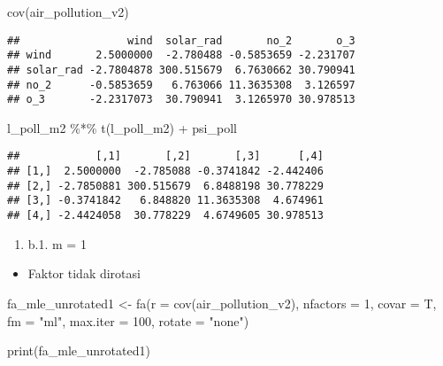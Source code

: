\documentclass[
]{article}
\newenvironment{Shaded}{\begin{snugshade}}{\end{snugshade}}
\newcommand{\AttributeTok}[1]{\textcolor[rgb]{0.77,0.63,0.00}{#1}}
\newcommand{\DecValTok}[1]{\textcolor[rgb]{0.00,0.00,0.81}{#1}}
\newcommand{\FunctionTok}[1]{\textcolor[rgb]{0.00,0.00,0.00}{#1}}
\newcommand{\NormalTok}[1]{#1}
\newcommand{\OtherTok}[1]{\textcolor[rgb]{0.56,0.35,0.01}{#1}}
\newcommand{\SpecialCharTok}[1]{\textcolor[rgb]{0.00,0.00,0.00}{#1}}
\newcommand{\StringTok}[1]{\textcolor[rgb]{0.31,0.60,0.02}{#1}}
\providecommand{\tightlist}{%
  \setlength{\itemsep}{0pt}\setlength{\parskip}{0pt}}
\begin{document}
\begin{Shaded}
\begin{Highlighting}[]
\FunctionTok{cov}\NormalTok{(air\_pollution\_v2)}
\end{Highlighting}
\end{Shaded}

\begin{verbatim}
##                 wind  solar_rad       no_2       o_3
## wind       2.5000000  -2.780488 -0.5853659 -2.231707
## solar_rad -2.7804878 300.515679  6.7630662 30.790941
## no_2      -0.5853659   6.763066 11.3635308  3.126597
## o_3       -2.2317073  30.790941  3.1265970 30.978513
\end{verbatim}

\begin{Shaded}
\begin{Highlighting}[]
\NormalTok{l\_poll\_m2 }\SpecialCharTok{\%*\%} \FunctionTok{t}\NormalTok{(l\_poll\_m2) }\SpecialCharTok{+}\NormalTok{ psi\_poll}
\end{Highlighting}
\end{Shaded}

\begin{verbatim}
##            [,1]       [,2]       [,3]      [,4]
## [1,]  2.5000000  -2.785088 -0.3741842 -2.442406
## [2,] -2.7850881 300.515679  6.8488198 30.778229
## [3,] -0.3741842   6.848820 11.3635308  4.674961
## [4,] -2.4424058  30.778229  4.6749605 30.978513
\end{verbatim}

\begin{enumerate}
\def\labelenumi{\alph{enumi}.}
\setcounter{enumi}{1}
\tightlist
\item
  b.1. m = 1
\end{enumerate}

\begin{itemize}
\tightlist
\item
  Faktor tidak dirotasi
\end{itemize}

\begin{Shaded}
\begin{Highlighting}[]
\NormalTok{fa\_mle\_unrotated1 }\OtherTok{\textless{}{-}} \FunctionTok{fa}\NormalTok{(}\AttributeTok{r =} \FunctionTok{cov}\NormalTok{(air\_pollution\_v2), }\AttributeTok{nfactors =} \DecValTok{1}\NormalTok{, }\AttributeTok{covar =}\NormalTok{ T, }\AttributeTok{fm =} \StringTok{"ml"}\NormalTok{, }\AttributeTok{max.iter =} \DecValTok{100}\NormalTok{, }\AttributeTok{rotate =} \StringTok{"none"}\NormalTok{)}

\FunctionTok{print}\NormalTok{(fa\_mle\_unrotated1)}
\end{Highlighting}
\end{Shaded}
\end{document}
